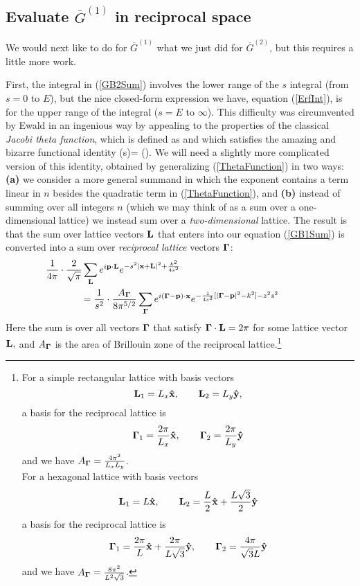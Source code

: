 \documentclass[letterpaper]{article}
\newcommand{\GB}{\overline{G}}
\begin{document}
\subsection*{Evaluate $\GB^{(1)}$ in reciprocal space} 

We would next like to do for $\GB^{(1)}$ what we just did for $\GB^{(2)}$,
but this requires a little more work. 

First, the integral in (\ref{GB2Sum}) involves the lower range of the 
$s$ integral (from $s=0$ to $E$), but the nice closed-form
expression we have, equation (\ref{ErfInt}), is for the upper range 
of the integral ($s=E$ to $\infty$). This difficulty was circumvented 
by Ewald in an ingenious way by appealing to the properties of the 
classical \textit{Jacobi theta function}, which is defined as 
and which satisfies the amazing and bizarre functional identity 
{ \theta(s)=\sqrt{} \cdot \theta\left(\right).}
We will need a slightly more complicated version of this identity,
obtained by generalizing (\ref{ThetaFunction}) in two ways: 
\textbf{(a)} we consider a more general summand in which the exponent
contains a term linear in $n$ besides the quadratic term 
in (\ref{ThetaFunction}), and 
\textbf{(b)} instead of summing over all integers $n$ (which we may 
think of as a sum over a one-dimensional lattice) we instead sum 
over a \textit{two-dimensional} lattice.
The result is that the sum over lattice vectors $\mathbf{L}$ that enters into
our equation (\ref{GB1Sum}) is converted into a sum over
\textit{reciprocal lattice} vectors $\boldsymbol{\Gamma}$:
\begin{align}
&\hspace{-0.5in}
 \frac{1}{4\pi} \cdot \frac{2}{\sqrt\pi} \sum_{\vb L} e^{i \vb p \cdot \vb L}
 e^{-s^2|\vb x + \vb L|^2 + \frac{k^2}{4s^2}}
\nn
&=\frac{1}{s^2} \cdot \frac{A_{\BG}}{8\pi^{5/2}}
 \sum_{\BG} e^{i(\BG-\vb p) \cdot \vb x} 
            e^{-\frac{1}{4s^2}[|\BG - \vb p|^2 - k^2] - z^2 s^2}
\label{DirectToReciprocal}
\end{align}
Here the sum is over all vectors $\boldsymbol{\Gamma}$ that satisfy 
$\boldsymbol{\Gamma} \cdot \mathbf{L}=2\pi$ for some lattice vector $\mathbf{L},$
and $A_{\boldsymbol{\Gamma}}$ is the area of Brillouin zone of the 
reciprocal lattice.\footnote{For a simple rectangular 
lattice with basis vectors 
$$\mathbf{L}_1=L_x\mathbf{\hat x}, \qquad \mathbf{L}_2=L_y\mathbf{\hat y},$$
a basis for the reciprocal lattice is 
$$\boldsymbol{\Gamma}_1=\frac{2\pi}{L_x}\mathbf{\hat x},\qquad \boldsymbol{\Gamma}_2=\frac{2\pi}{L_y}\mathbf{\hat y}$$
and we have $A_{\boldsymbol{\Gamma}}=\frac{4\pi^2}{L_x L_y}$.\\
For a hexagonal lattice with basis vectors 
$$ \mathbf{L}_1=L\mathbf{\hat x}, \qquad 
   \mathbf{L}_2=\frac{L}{2}\mathbf{\hat x} + \frac{L\sqrt{3}}{2}\mathbf{\hat y}
$$
a basis for the reciprocal lattice is 
$$ \boldsymbol{\Gamma}_1=\frac{2\pi}{L}\mathbf{\hat x} + \frac{2\pi}{L\sqrt{3}}\mathbf{\hat y},
   \qquad 
   \boldsymbol{\Gamma}_2=\frac{4\pi}{\sqrt{3} L}\mathbf{\hat y}
$$
and we have $A_{\boldsymbol{\Gamma}}=\frac{8\pi^2}{L^2 \sqrt{3}}$.
}
\end{document}
